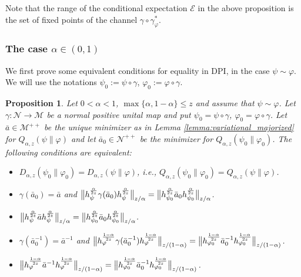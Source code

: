 \documentclass[12pt]{article}
\newtheorem{prop}[theorem]{Proposition}
\theoremstyle{definition}
\theoremstyle{remark}
\numberwithin{equation}{section}
\def\Me{\mathcal M}
\def\Ne{\mathcal N}
\def\ffi{\varphi}
\begin{document}
Note that the range of the conditional expectation $\mathcal E$ in the above proposition
is the set  of fixed points of the channel $\gamma\circ\gamma_\varphi^*$. 






\subsubsection{The case $\alpha\in (0,1)$}



We first prove some equivalent conditions for equality in DPI, in the case $\psi\sim
\ffi$. We will use the notations $\psi_0:=\psi\circ\gamma$, $\ffi_0:=\ffi\circ\gamma$.

\begin{prop}\label{prop:DPI_equality}
Let $0<\alpha<1$, $\max\{\alpha,1-\alpha\}\le z$ and assume that $\psi\sim \ffi$. Let
$\gamma:\Ne\to \Me$ be a normal positive unital map and put $\psi_0=\psi\circ\gamma$,
$\ffi_0=\ffi\circ\gamma$. Let 
$\bar a\in \Me^{++}$  
be the unique minimizer as in Lemma \ref{lemma:variational_majorized} for
$Q_{\alpha,z}(\psi\|\ffi)$ and let $\bar a_0\in \Ne^{++}$ be the minimizer for
$Q_{\alpha,z}(\psi_0\|\ffi_0)$. The following conditions are equivalent:
\begin{itemize}
\item[(i)] $D_{\alpha,z}(\psi_0\|\ffi_0)=D_{\alpha,z}(\psi\|\ffi)$, i.e.,
$Q_{\alpha,z}(\psi_0\|\ffi_0)=Q_{\alpha,z}(\psi\|\ffi)$.
\item[(ii)] $\gamma(\bar a_0)=\bar a$ and
$\big\|h_\psi^{\alpha\over2z}\gamma(\bar a_0)h_\psi^{\alpha\over2z}\big\|_{z/\alpha}
=\big\|h_{\psi_0}^{\alpha\over2z}\bar a_0h_{\psi_0}^{\alpha\over2z}\big\|_{z/\alpha}$.
\item[(iii)] $\big\|h_\psi^{\alpha\over2z}\bar ah_\psi^{\alpha\over2z}\big\|_{z/\alpha}
=\big\|h_{\psi_0}^{\alpha\over2z}\bar a_0h_{\psi_0}^{\alpha\over2z}\big\|_{z/\alpha}$.
\item[(iv)] $\gamma(\bar a_0^{-1})=\bar a^{-1}$ and
$\big\|h_\ffi^{1-\alpha\over2z}\gamma(\bar a_0^{-1})h_\ffi^{1-\alpha\over2z}\big\|_{z/(1-\alpha)}
=\big\|h_{\ffi_0}^{1-\alpha\over2z}\bar a_0^{-1}h_{\ffi_0}^{1-\alpha\over2z}\big\|_{z/(1-\alpha)}$.
\item[(v)] $\big\|h_\ffi^{1-\alpha\over2z}\bar a^{-1}h_\ffi^{1-\alpha\over2z}\big\|_{z/(1-\alpha)}
=\big\|h_{\ffi_0}^{1-\alpha\over2z}\bar a_0^{-1}h_{\ffi_0}^{1-\alpha\over2z}\big\|_{z/(1-\alpha)}$.
\end{itemize}
\end{prop}
\end{document}
